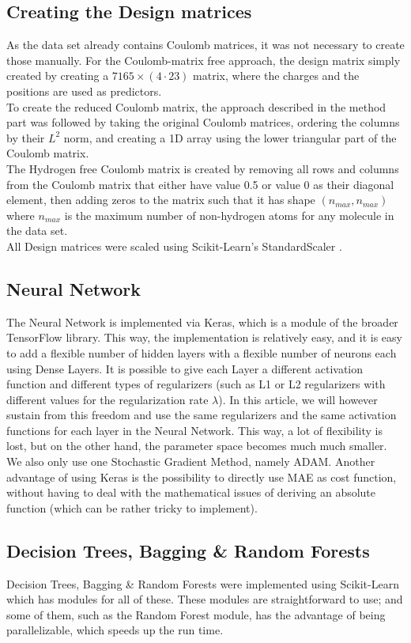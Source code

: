\documentclass[11pt,a4paper,notitlepage]{article}
\begin{document}
\subsection{Creating the Design matrices}
As the data set already contains Coulomb matrices, it was not necessary to create those manually. For the Coulomb-matrix free approach, the design matrix simply created by creating a $7165\times (4\cdot23)$ matrix, where the charges and the positions are used as predictors.\\
To create the reduced Coulomb matrix, the approach described in the method part was followed by taking the original Coulomb matrices, ordering the columns by their $L^2$ norm, and creating a 1D array using the lower triangular part of the Coulomb matrix.\\
The Hydrogen free Coulomb matrix is created by removing all rows and columns from the Coulomb matrix that either have value 0.5 or value 0 as their diagonal element, then adding zeros to the matrix such that it has shape $(n_{max},n_{max})$ where $n_{max}$ is the maximum number of non-hydrogen atoms for any molecule in the data set.\\
All Design matrices were scaled using Scikit-Learn's StandardScaler \citep{scikit-learn}. 
\subsection{Neural Network}
The Neural Network is implemented via Keras, which is a module of the broader TensorFlow \citep{tensorflow2015-whitepaper} library. This way, the implementation is relatively easy, and it is easy to add a flexible number of hidden layers with a flexible number of neurons each using Dense Layers. It is possible to give each Layer a different activation function and different types of regularizers (such as L1 or L2 regularizers with different values for the regularization rate $\lambda$). In this article, we will however sustain from this freedom and use the same regularizers and the same activation functions for each layer in the Neural Network. This way, a lot of flexibility is lost, but on the other hand, the parameter space becomes much much smaller. We also only use one Stochastic Gradient Method, namely ADAM. Another advantage of using Keras is the possibility to directly use MAE as cost function, without having to deal with the mathematical issues of deriving an absolute function (which can be rather tricky to implement). 
\subsection{Decision Trees, Bagging \& Random Forests}
Decision Trees, Bagging \& Random Forests were implemented using Scikit-Learn \citep{scikit-learn} which has modules for all of these. These modules are straightforward to use; and some of them, such as the Random Forest module, has the advantage of being parallelizable, which speeds up the run time. 
\end{document}
